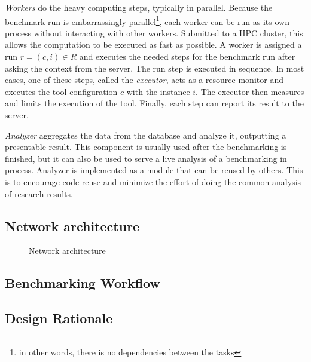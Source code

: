 \emph{Workers} do the heavy computing steps, typically in parallel.
Because the benchmark run is embarrassingly parallel\footnote{in other words, there is no dependencies between the tasks}, each worker can be run as its own process without interacting with other workers.
Submitted to a HPC cluster, this allows the computation to be executed as fast as possible.
A worker is assigned a run $r = (c, i) \in R$ and executes the needed steps for the benchmark run after asking the context from the server.
The run step is executed in sequence.
In most cases, one of these steps, called the \emph{executor}, acts as a resource monitor and executes the tool configuration $c$ with the instance $i$.
The executor then measures and limits the execution of the tool.
Finally, each step can report its result to the server.

\emph{Analyzer} aggregates the data from the database and analyze it, outputting a presentable result.
This component is usually used after the benchmarking is finished, but it can also be used to serve a live analysis of a benchmarking in process.
Analyzer is implemented as a module that can be reused by others.
This is to encourage code reuse and minimize the effort of doing the common analysis of research results.


\subsection{Network architecture}

\begin{figure}
    
    \caption{Network architecture}
    \label{fig:zmq}
\end{figure}


\subsection{Benchmarking Workflow}
\subsection{Design Rationale}



